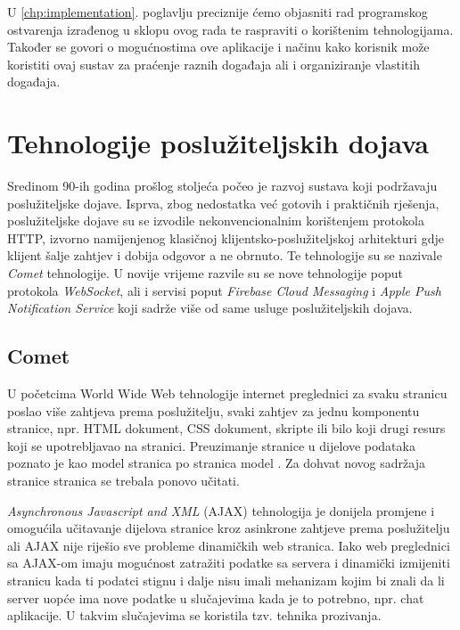 \documentclass[times, utf8, zavrsni]{fer}
\begin{document}
U \ref{chp:implementation}. poglavlju preciznije ćemo objasniti rad programskog ostvarenja izrađenog u sklopu ovog rada te raspraviti o korištenim tehnologijama. Također se govori o mogućnostima ove aplikacije i načinu kako korisnik može koristiti ovaj sustav za praćenje raznih događaja ali i organiziranje vlastitih događaja.

\chapter{Tehnologije poslužiteljskih dojava}
\label{chp:technologies}

Sredinom 90-ih godina prošlog stoljeća počeo je razvoj sustava koji podržavaju poslužiteljske dojave. Isprva, zbog nedostatka već gotovih i praktičnih rješenja, poslužiteljske dojave su se izvodile nekonvencionalnim korištenjem protokola HTTP, izvorno namijenjenog klasičnoj klijentsko-poslužiteljskoj arhitekturi gdje klijent šalje zahtjev i dobija odgovor a ne obrnuto. Te tehnologije su se nazivale {\em Comet} tehnologije. U novije vrijeme razvile su se nove tehnologije poput protokola {\em WebSocket}, ali i servisi poput {\em Firebase Cloud Messaging} i {\em Apple Push Notification Service} koji sadrže više od same usluge poslužiteljskih dojava.

\section{Comet}
U početcima World Wide Web tehnologije internet preglednici za svaku stranicu poslao više zahtjeva prema poslužitelju, svaki zahtjev za jednu komponentu stranice, npr. HTML dokument, CSS dokument, skripte ili bilo koji drugi resurs koji se upotrebljavao na stranici. Preuzimanje stranice u dijelove podataka poznato je kao model stranica po stranica model . Za dohvat novog sadržaja stranice stranica se trebala ponovo učitati.

{\em Asynchronous Javascript and XML} (AJAX) tehnologija je donijela promjene i omogućila učitavanje dijelova stranice kroz asinkrone zahtjeve prema poslužitelju ali AJAX nije riješio sve probleme dinamičkih web stranica. Iako web preglednici sa AJAX-om imaju mogućnost zatražiti podatke sa servera i dinamički izmijeniti stranicu kada ti podatci stignu i dalje nisu imali mehanizam kojim bi znali da li server uopće ima nove podatke u slučajevima kada je to potrebno, npr. chat aplikacije. U takvim slučajevima se koristila tzv. tehnika prozivanja.\citep{gravelle2009comet}
\end{document}

